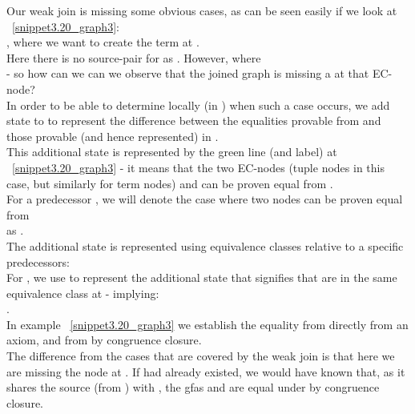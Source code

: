 Our weak join is missing some obvious cases, as can be seen easily if we look at ~\ref{snippet3.20_graph3}:\\
, where we want to create the term  at .\\
Here there is no source-pair for  as .
However,  where \\
 - so how can we can we observe that the joined graph is missing a \gfa at that EC-node?\\
In order to be able to determine locally (in ) when such a case occurs, we add state to  to represent the difference between
the equalities provable from  and those provable (and hence represented) in .\\
This additional state is represented by the green line (and label) at ~\ref{snippet3.20_graph3} - it means that the two EC-nodes (tuple nodes in this case, but similarly for term nodes)  and  can be proven equal from .\\
For a predecessor , we will denote the case where two nodes  can be proven equal from \\
  as .\\
The additional state is represented using equivalence classes relative to a specific predecessors:\\
For , we use  to represent the additional state that signifies that  are in the same equivalence class at  - implying:\\
.\\
In example ~\ref{snippet3.20_graph3} we establish the equality  from  directly from an axiom, 
and from  by congruence closure.\\
The difference from the cases that are covered by the weak join is that here we are missing the node  at .
If  had already existed, we would have known that, as it shares the source  (from ) with , the gfas  and  are equal under  by congruence closure.\\
